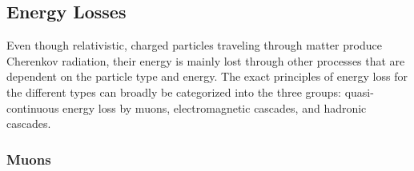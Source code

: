 \subsection{Energy Losses} 

Even though relativistic, charged particles traveling through matter produce Cherenkov radiation, their energy is mainly lost through other processes that are dependent on the particle type and energy. The exact principles of energy loss for the different types can broadly be categorized into the three groups: quasi-continuous energy loss by muons, electromagnetic cascades, and hadronic cascades.


\subsubsection{Muons}

